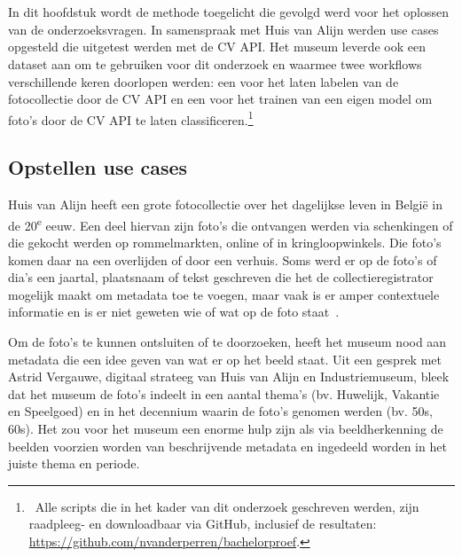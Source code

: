
\chapter{}
\label{ch:methodologie}

In dit hoofdstuk wordt de methode toegelicht die gevolgd werd voor het oplossen van de onderzoeksvragen. In samenspraak met Huis van Alijn werden use cases opgesteld die uitgetest werden met de CV API. Het museum leverde ook een dataset aan om te gebruiken voor dit onderzoek en waarmee twee workflows verschillende keren doorlopen werden: een voor het laten labelen van de fotocollectie door de CV API en een voor het trainen van een eigen model om foto's door de CV API te laten classificeren.\footnote{~Alle scripts die in het kader van dit onderzoek geschreven werden, zijn raadpleeg- en downloadbaar via GitHub, inclusief de resultaten: \url{https://github.com/nvanderperren/bachelorproef}.}

\section{Opstellen use cases}
\label{sec:opstellen-use-cases}

Huis van Alijn heeft een grote fotocollectie over het dagelijkse leven in Belgi\"{e} in de 20\textsuperscript{e} eeuw. Een deel hiervan zijn foto’s die ontvangen werden via schenkingen of die gekocht werden op rommelmarkten, online of in kringloopwinkels. Die foto's komen daar na een overlijden of door een verhuis. Soms werd er op de foto's of dia's een jaartal, plaatsnaam of tekst geschreven die het de collectieregistrator mogelijk maakt om metadata toe te voegen, maar vaak is er amper contextuele informatie en is er niet geweten wie of wat op de foto staat~\autocite{Heemkunde}. 

Om de foto’s te kunnen ontsluiten of te doorzoeken, heeft het museum nood aan metadata die een idee geven van wat er op het beeld staat. Uit een gesprek met Astrid Vergauwe, digitaal strateeg van Huis van Alijn en Industriemuseum, bleek dat het museum de foto’s indeelt in een aantal thema’s (bv. Huwelijk, Vakantie en Speelgoed) en in het decennium waarin de foto’s genomen werden (bv. 50s, 60s). Het zou voor het museum een enorme hulp zijn als via beeldherkenning de beelden voorzien worden van beschrijvende metadata en ingedeeld worden in het juiste thema en periode.

